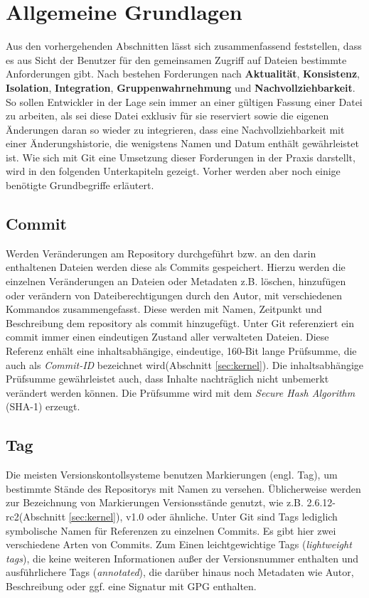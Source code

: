 \section{Allgemeine Grundlagen}\label{sec:Grundlagen}
Aus den vorhergehenden Abschnitten lässt sich zusammenfassend feststellen, dass
es aus Sicht der Benutzer für den gemeinsamen Zugriff auf Dateien bestimmte
Anforderungen gibt. Nach \cite[S.~37]{hagen:1678} bestehen Forderungen nach
\textbf{Aktualität}, \textbf{Konsistenz}, \textbf{Isolation},
\textbf{Integration}, \textbf{Gruppenwahrnehmung} und
\textbf{Nachvollziehbarkeit}. So sollen Entwickler in der Lage sein immer an
einer gültigen Fassung einer Datei zu arbeiten, als sei diese Datei exklusiv für
sie reserviert sowie die eigenen Änderungen daran so wieder zu integrieren, dass
eine Nachvollziehbarkeit mit einer Änderungshistorie, die wenigstens Namen und
Datum enthält gewährleistet ist. Wie sich mit Git eine Umsetzung dieser
Forderungen in der Praxis darstellt, wird in den folgenden Unterkapiteln
gezeigt. Vorher werden aber noch einige benötigte Grundbegriffe erläutert.

\subsection{Commit}\label{sec:commit}
Werden Veränderungen am Repository durchgeführt bzw. an den darin enthaltenen
Dateien werden diese als Commits gespeichert. Hierzu werden die einzelnen
Veränderungen an Dateien oder Metadaten z.B. löschen, hinzufügen oder verändern
von Dateiberechtigungen durch den Autor, mit verschiedenen Kommandos
zusammengefasst. Diese werden mit Namen, Zeitpunkt und Beschreibung dem
\gls{repository} als \gls{commit} hinzugefügt. Unter Git referenziert ein
\gls{commit} immer einen eindeutigen Zustand aller verwalteten Dateien. Diese
Referenz enhält eine inhaltsabhängige, eindeutige, 160-Bit lange Prüfsumme, die
auch als \textit{Commit-ID} bezeichnet wird(Abschnitt \ref{sec:kernel}). Die
inhaltsabhängige Prüfsumme gewährleistet auch, dass Inhalte nachträglich nicht
unbemerkt verändert werden können. Die Prüfsumme wird mit dem \textit{Secure
Hash Algorithm} (\gls{SHA-1}) erzeugt.\cite[S.~20-21]{gitosp}

\subsection{Tag}\label{sec:tag}
Die meisten Versionskontollsysteme benutzen Markierungen (engl. Tag), um
bestimmte Stände des Repositorys mit Namen zu versehen. Üblicherweise werden
zur Bezeichnung von Markierungen Versionsstände genutzt, wie z.B.
2.6.12-rc2(Abschnitt \ref{sec:kernel}), v1.0 oder ähnliche. Unter Git sind Tags
lediglich symbolische Namen für Referenzen zu einzelnen Commits. Es gibt hier
zwei verschiedene Arten von Commits. Zum Einen leichtgewichtige Tags
(\textit{lightweight tags}), die keine weiteren Informationen außer der
Versionsnummer enthalten und ausführlichere Tags (\textit{annotated}), die
darüber hinaus noch Metadaten wie Autor, Beschreibung oder ggf. eine Signatur
mit GPG enthalten.\cite[S.~48]{progit}


